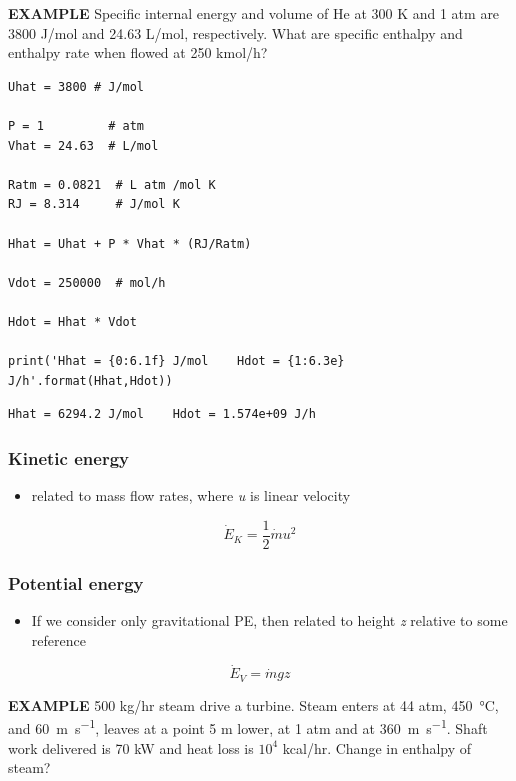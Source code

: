 \documentclass[11pt]{article}
\begin{document}
\begin{framed}
\noindent \textbf{EXAMPLE} Specific internal energy and volume of He at 300 K and 1 atm are 3800 J/mol and 24.63 L/mol, respectively.  What are specific enthalpy and enthalpy rate when flowed at 250 kmol/h?
\end{framed}

\begin{verbatim}
Uhat = 3800 # J/mol

P = 1         # atm
Vhat = 24.63  # L/mol

Ratm = 0.0821  # L atm /mol K
RJ = 8.314     # J/mol K

Hhat = Uhat + P * Vhat * (RJ/Ratm)

Vdot = 250000  # mol/h

Hdot = Hhat * Vdot

print('Hhat = {0:6.1f} J/mol    Hdot = {1:6.3e} J/h'.format(Hhat,Hdot))
\end{verbatim}

\begin{verbatim}
Hhat = 6294.2 J/mol    Hdot = 1.574e+09 J/h
\end{verbatim}

\subsubsection{Kinetic energy}
\label{sec-9-3-3}
\begin{itemize}
\item related to mass flow rates, where \emph{u} is linear velocity
\end{itemize}

\[ \dot{E}_{K} = \frac{1}{2}\dot{m} u^{2}\]


\subsubsection{Potential energy}
\label{sec-9-3-4}

\begin{itemize}
\item If we consider only gravitational PE, then related to height \emph{z} relative to some reference
\end{itemize}

\[ \dot{E}_{V} = \dot{m} g z \]

\begin{framed}
\noindent \textbf{EXAMPLE}  500 kg/hr steam drive a turbine.  Steam enters at 44 atm, \SI{450}{\celsius}, and \SI{60}{\meter\per\second}, leaves at a point 5 m lower, at 1 atm and at \SI{360}{\meter\per\second}.  Shaft work delivered is 70 kW and heat loss is \(10^{4}\) kcal/hr.  Change in enthalpy of steam?
\end{framed}
\end{document}
